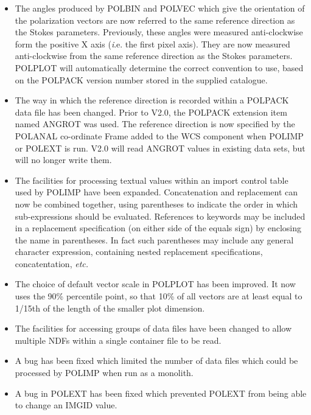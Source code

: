 \documentclass[twoside,11pt]{article}
\newcommand{\htmlref}[2]{#1}
\renewcommand{\_}{\texttt{\symbol{95}}}
\begin{document}
\begin{itemize}
\item The angles produced by \htmlref{POLBIN}{POLBIN} and
\htmlref{POLVEC}{POLVEC} which
give the orientation of the polarization vectors are now referred to the
same reference direction as the Stokes parameters. Previously, these
angles were measured anti-clockwise form the positive X axis ({\emph
i.e.} the first pixel axis). They are now measured anti-clockwise from
the same reference direction as the Stokes parameters.
\htmlref{POLPLOT}{POLPLOT}
will automatically determine the correct convention to use, based on the
POLPACK version number stored in the supplied catalogue.

\item The way in which the reference direction is recorded within a
POLPACK data file has been changed. Prior to V2.0, the POLPACK extension
item named ANGROT was used. The reference direction is now specified by
the POLANAL co-ordinate Frame added to the WCS component when
\htmlref{POLIMP}{POLIMP} or \htmlref{POLEXT}{POLIMP} is run. V2.0 will read 
ANGROT values in existing data sets, but will no longer write them.

\item The facilities for processing textual values within an import
control table used by \htmlref{POLIMP}{POLIMP} have been expanded.
Concatenation and replacement can now be combined together, using
parentheses to indicate the order in which sub-expressions should be
evaluated. References to keywords may be included in a replacement
specification (on either side of the equals sign) by enclosing the name 
in parentheses. In fact such parentheses may include any general
character expression, containing nested replacement specifications,
concatentation, \emph{etc.}

\item The choice of default vector scale in \htmlref{POLPLOT}{POLPLOT}
has been improved. It now uses the 90\% percentile point, so that 10\% of 
all vectors are at least equal to 1/15th of the length of the smaller plot
dimension.

\item The facilities for accessing groups of data files have been changed
to allow multiple NDFs within a single container file to be read. 

\item A bug has been fixed which limited the number of data files which 
could be processed by \htmlref{POLIMP}{POLIMP} when run as a monolith.

\item A bug in \htmlref{POLEXT}{POLEXT} has been fixed which prevented 
POLEXT from being able to change an IMGID value. 


\end{itemize}
\end{document}
